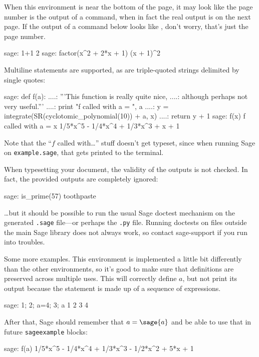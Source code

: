\documentclass{article}
\begin{document}
When this environment is near the bottom of the page, it may look like
the page number is the output of a command, when in fact the real output
is on the next page. If the output of a command below looks like
\thepage, don't worry, that's just the page number.
\begin{sageexample}
  sage: 1+1
  2
  sage: factor(x^2 + 2*x + 1)
  (x + 1)^2
\end{sageexample}
Multiline statements are supported, as are triple-quoted strings
delimited by single quotes:
\renewcommand{\sageexampleincludetextoutput}{False}
\begin{sageexample}
  sage: def f(a):
  ....:     '''This function is really quite nice,
  ....:     although perhaps not very useful.'''
  ....:     print "f called with a = ", a
  ....:     y = integrate(SR(cyclotomic_polynomial(10)) + a, x)
  ....:     return y + 1
  sage: f(x)
  f called with a =  x
  1/5*x^5 - 1/4*x^4 + 1/3*x^3 + x + 1
\end{sageexample}
Note that the ``$f$ called with\ldots'' stuff doesn't get typeset, since
when running Sage on \texttt{example.sage}, that gets printed to the
terminal.

When typesetting your document, the validity of the outputs is not
checked. In fact, the provided outputs are completely ignored:
\renewcommand{\sageexampleincludetextoutput}{True}
\begin{sageexample}
  sage: is_prime(57)
  toothpaste
\end{sageexample}
\renewcommand{\sageexampleincludetextoutput}{False}
\ldots but it should be possible to run the usual Sage doctest mechanism
on the generated \texttt{.sage} file---or perhaps the \texttt{.py} file.
Running doctests on files outside the main Sage library does not always
work, so contact sage-support if you run into troubles.

Some more examples. This environment is implemented a little bit
differently than the other environments, so it's good to make sure that
definitions are preserved across multiple uses. This will correctly
define $a$, but not print its output because the statement is made up of
a sequence of expressions.
\begin{sageexample}
  sage: 1; 2; a=4; 3; a
  1
  2
  3
  4
\end{sageexample}
After that, Sage should remember that $a = \sage{a}$ and be able to use
that in future \texttt{sageexample} blocks:
\begin{sageexample}
  sage: f(a)
  1/5*x^5 - 1/4*x^4 + 1/3*x^3 - 1/2*x^2 + 5*x + 1
\end{sageexample}
\end{document}
